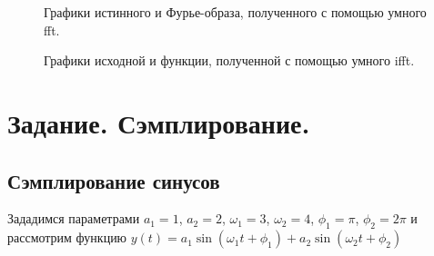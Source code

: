 \documentclass[a5paper, 10pt]{article}
\theoremstyle{definition}
\theoremstyle{plain}
\theoremstyle{remark}
\begin{document}
\begin{figure}[h!]
\caption{Графики истинного и Фурье-образа, полученного с помощью умного fft.}
\caption{Графики исходной и функции, полученной с помощью умного ifft.}
\end{figure}




\newpage
\section{Задание. Сэмплирование.}

\subsection{Сэмплирование синусов}
Зададимся параметрами $a_1=1$, $a_2=2$, $\omega_1 = 3$, $\omega_2 = 4$, $\phi_1 = \pi$, $\phi_2 = 2\pi$ и рассмотрим функцию $y(t) = a_1 \sin \left( \omega_1 t + \phi_1 \right) + a_2 \sin \left(  \omega_2 t + \phi_2 \right)$
\end{document}
